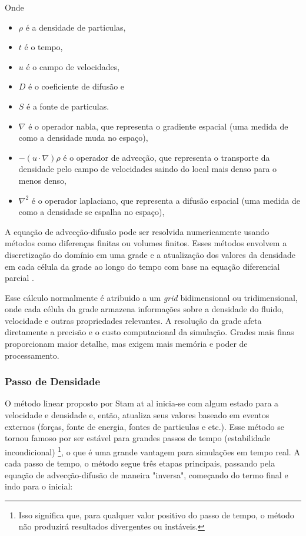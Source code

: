 Onde 
\begin{itemize}
  \item $\rho$ é a densidade de particulas,
  \item $t$ é o tempo,
  \item $u$ é o campo de velocidades,
  \item $D$ é o coeficiente de difusão e
  \item $S$ é a fonte de particulas.
  \item $\nabla$ é o operador nabla, que representa o gradiente espacial (uma medida de como a densidade muda no espaço),
  \item $-(u \cdot \nabla)\rho$ é o operador de advecção, que representa o transporte da densidade pelo campo de velocidades saindo do local mais denso para o menos denso,
  \item $\nabla^2$ é o operador laplaciano, que representa a difusão espacial (uma medida de como a densidade se espalha no espaço),
\end{itemize}

A equação de advecção-difusão pode ser resolvida numericamente usando métodos como diferenças finitas ou volumes finitos. Esses métodos envolvem a discretização do domínio em uma grade e a atualização dos valores da densidade em cada célula da grade ao longo do tempo com base na equação diferencial parcial \cite{Stam2003}.

Esse cálculo normalmente é atribuido a um \textit{grid} bidimensional ou tridimensional, onde cada célula da grade armazena informações sobre a densidade do fluido, velocidade e outras propriedades relevantes. A resolução da grade afeta diretamente a precisão e o custo computacional da simulação. Grades mais finas proporcionam maior detalhe, mas exigem mais memória e poder de processamento.

\subsubsection*{Passo de Densidade}
O método linear proposto por Stam at al \cite{Stam2003} inicia-se com algum estado para a velocidade e densidade e, então, atualiza seus valores baseado em eventos externos (forças, fonte de energia, fontes de particulas e etc.). Esse método se tornou famoso por ser estável para grandes passos de tempo (estabilidade incondicional) \footnote{Isso significa que, para qualquer valor positivo do passo de tempo, o método não produzirá resultados divergentes ou instáveis.}, o que é uma grande vantagem para simulações em tempo real. A cada passo de tempo, o método segue três etapas principais, passando pela equação de advecção-difusão de maneira "inversa", começando do termo final e indo para o inicial:

